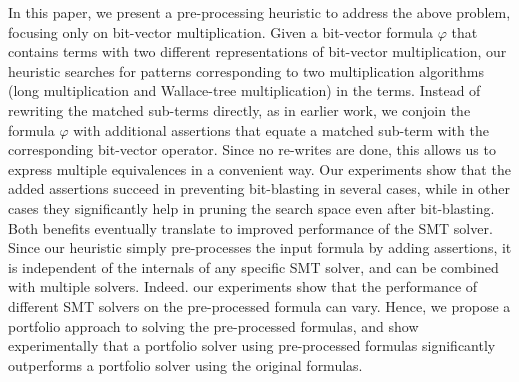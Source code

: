 In this paper, we present a pre-processing heuristic to address the
above problem, focusing only on bit-vector multiplication.  Given a
bit-vector formula $\varphi$ that contains terms with two different
representations of bit-vector multiplication, our heuristic searches
for patterns corresponding to two multiplication algorithms (long
multiplication and Wallace-tree multiplication) in the terms. Instead
of rewriting the matched sub-terms directly, as in earlier work, we
conjoin the formula $\varphi$ with additional assertions that equate a
matched sub-term with the corresponding bit-vector operator.  Since no
re-writes are done, this allows us to express multiple equivalences in
a convenient way.  Our experiments show that the added assertions
succeed in preventing bit-blasting in several cases, while in other
cases they significantly help in pruning the search space even after
bit-blasting.  Both benefits eventually translate to improved
performance of the SMT solver.  Since our heuristic simply
pre-processes the input formula by adding assertions, it is
independent of the internals of any specific SMT solver, and can be
combined with multiple solvers.  Indeed.  our experiments show that
the performance of different SMT solvers on the pre-processed formula
can vary.  Hence, we propose a portfolio approach to solving the
pre-processed formulas, and show experimentally that a portfolio
solver using pre-processed formulas significantly outperforms a
portfolio solver using the original formulas.



%




